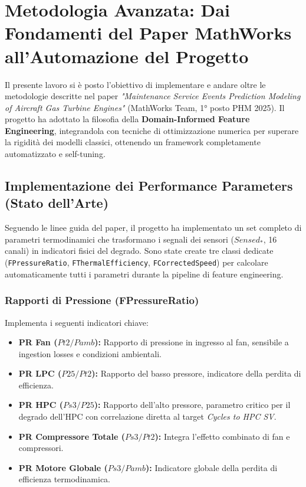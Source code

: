 \section{Metodologia Avanzata: Dai Fondamenti del Paper MathWorks all'Automazione del Progetto}

Il presente lavoro si è posto l'obiettivo di implementare e andare oltre le metodologie descritte nel paper \textit{"Maintenance Service Events Prediction Modeling of Aircraft Gas Turbine Engines"} (MathWorks Team, 1° posto PHM 2025). Il progetto ha adottato la filosofia della \textbf{Domain-Informed Feature Engineering}, integrandola con tecniche di ottimizzazione numerica per superare la rigidità dei modelli classici, ottenendo un framework completamente automatizzato e self-tuning.

\subsection{Implementazione dei Performance Parameters (Stato dell'Arte)}

Seguendo le linee guida del paper, il progetto ha implementato un set completo di parametri termodinamici che trasformano i segnali dei sensori ($Sensed_*$, 16 canali) in indicatori fisici del degrado. Sono state create tre classi dedicate (\texttt{FPressureRatio}, \texttt{FThermalEfficiency}, \texttt{FCorrectedSpeed}) per calcolare automaticamente tutti i parametri durante la pipeline di feature engineering.

\subsubsection{Rapporti di Pressione (FPressureRatio)}

Implementa i seguenti indicatori chiave:
\begin{itemize}
    \item \textbf{PR Fan ($Pt2/Pamb$):} Rapporto di pressione in ingresso al fan, sensibile a ingestion losses e condizioni ambientali.
    \item \textbf{PR LPC ($P25/Pt2$):} Rapporto del basso pressore, indicatore della perdita di efficienza.
    \item \textbf{PR HPC ($Ps3/P25$):} Rapporto dell'alto pressore, parametro critico per il degrado dell'HPC con correlazione diretta al target \textit{Cycles to HPC SV}.
    \item \textbf{PR Compressore Totale ($Ps3/Pt2$):} Integra l'effetto combinato di fan e compressori.
    \item \textbf{PR Motore Globale ($Ps3/Pamb$):} Indicatore globale della perdita di efficienza termodinamica.
\end{itemize}

